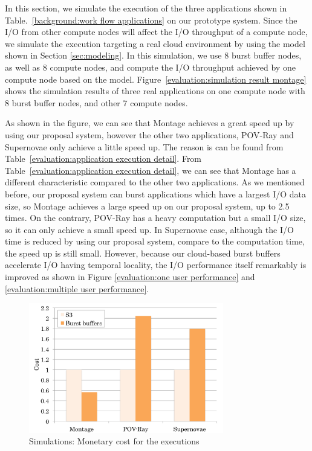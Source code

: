  In this section, we simulate the execution of the three applications shown in
 Table.~\ref{background:work flow applications} on our prototype system.
 Since the I/O from other compute nodes will affect the I/O throughput of a
 compute node, we simulate the execution targeting a real cloud environment by
 using the model shown in Section \ref{sec:modeling}.
 In this simulation, we use 8 burst buffer nodes, as well as 8 compute nodes,
 and compute the I/O throughput achieved by one compute node based on the model.
 Figure~\ref{evaluation:simulation result montage} shows the simulation results
 of three real applications on one compute node with 8 burst buffer nodes, and
 other 7 compute nodes. 
 
 As shown in the figure, we  can see that Montage achieves a great speed up by
 using our proposal system, however the other two applications, POV-Ray and
 Supernovae only achieve a little speed up.
 The reason is can be found from Table~\ref{evaluation:application execution detail}.
 From Table~\ref{evaluation:application execution detail}, we can see that Montage has a different
 characteristic compared to the other two applications.
 As we mentioned before, our proposal system can burst applications which have a largest I/O data
 size, so Montage achieves a large speed up on our proposal system, up to 2.5
 times.
 On the contrary, POV-Ray has a heavy computation but a small I/O size, so it
 can only achieve a small speed up.
 In Supernovae case, although the I/O time is reduced by using our proposal system, compare to the
 computation time, the speed up is still small.
 However, because our cloud-based burst buffers accelerate I/O having temporal
 locality, the I/O performance itself remarkably is improved as shown in Figure
 \ref{evaluation:one user performance} and \ref{evaluation:multiple user
 performance}.
 
 \begin{figure}
\centering
\includegraphics[width=8.5cm]{img/cost-2}
\caption{Simulations: Monetary cost for the executions}
\label{evaluation:simulation result cost}
\end{figure}
 

